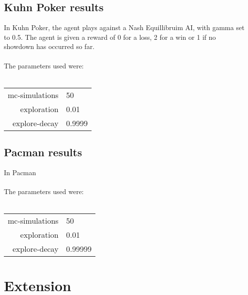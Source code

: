 \documentclass[pdftex,twoside,a4paper]{report}
\begin{document}
\section{Kuhn Poker results}
In Kuhn Poker, the agent plays against a Nash Equillibruim AI, with gamma set to 0.5. The agent is given a reward of 0 for a loss, 2 for a win or 1 if no showdown has occurred so far.\\\\
The parameters used were:\\\\
\begin{tabular}{| r | l | }
\hline
mc-simulations & 50\\
exploration & 0.01\\
explore-decay & 0.9999\\
\hline
\end{tabular}
\section{Pacman results}
In Pacman\\\\
The parameters used were:\\\\
\begin{tabular}{| r | l | }
\hline
mc-simulations & 50\\
exploration & 0.01\\
explore-decay & 0.99999\\
\hline
\end{tabular}

\chapter{Extension}



\end{document}
